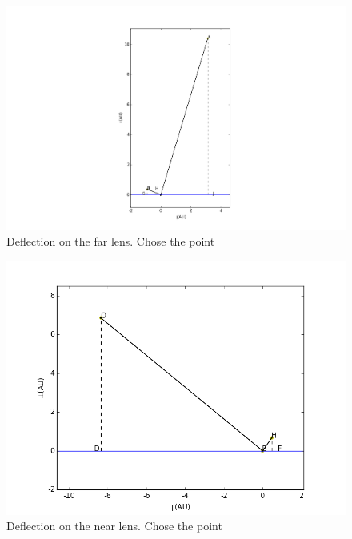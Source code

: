 \documentclass[useAMS,usenatbib]{mn2e}
\begin{document}
\begin{figure}
\centering
\includegraphics[width=1.0\linewidth,scale=1.0]{First_reflection.png}
\caption{Deflection on the far lens. Chose the point}
\label{first_reflect}
\end{figure}

\begin{figure}
\centering
\includegraphics[width=1.0\linewidth]{Second_reflection.png}
\caption{Deflection on the near lens. Chose the point}
\label{second_reflect}
\end{figure}
\end{document}
